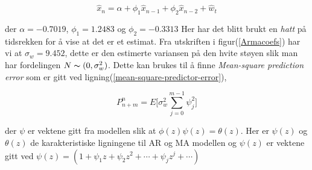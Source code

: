 \begin{equation}
\hat{x}_{n} = \alpha + \phi_{1}\hat{x}_{n-1} + \phi_{2}\hat{x}_{n-2} + \hat{w}_{t}
\end{equation}

der $\alpha = -0.7019$, $\phi_{1} = 1.2483$ og $\phi_{2} = -0.3313$
Her har det blitt brukt en \emph{hatt} på tidsrekken for å vise at det er et estimat. Fra utskriften i figur(\ref{Armacoefs}) har vi at $\sigma_{w} = 9.452$, dette er den estimerte variansen på den hvite støyen slik man har fordelingen $N \thicksim (0, \sigma_{w}^{2})$. Dette kan brukes til å finne \emph{Mean-square prediction error} som er gitt ved ligning(\ref{mean-square-predictor-error}),

\begin{equation}
    P^{n}_{n + m} = E\bigg[\sigma_{w}^{2}\sum_{j = 0}^{m-1}\psi_{j}^{2}\bigg]
    \label{mean-square-predictor-error}
\end{equation}

der $\psi$ er vektene gitt fra modellen slik at $\phi(z)\psi(z) = \theta(z)$. Her er $\psi(z)$ og $\theta(z)$ de karakteristiske ligningene til AR og MA modellen og $\psi(z)$ er vektene gitt ved $\psi(z) = (1 + \psi_{1}z + \psi_{2}z^2 + \cdots + \psi_{j}z^{j}+\cdots)$

